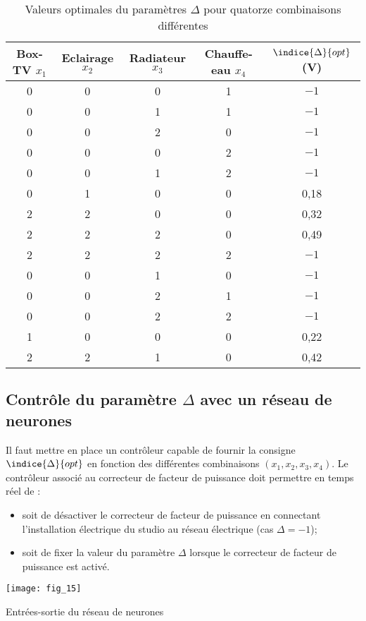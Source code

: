 \begin{table}[!h]
\centering
\begin{tabular}{ccccc}
\hline
Box-TV $x_1$ & Eclairage $x_2$ & Radiateur $x_3$ & Chauffe-eau $x_4$ & $\indice{\Delta}{opt}$ (V) \\
\hline
0 	& 0 	& 0 	& 1 	& $-1$ \\
0 	& 0	& 1 	& 1	& $-1$ \\
0 	& 0 	& 2 	& 0 	& $-1$ \\
0 	& 0 	& 0	& 2	& $-1$ \\
0 	& 0 	& 1	& 2	& $-1$ \\
0 	& 1 	& 0	& 0	& 0,18\\
2	& 2 	& 0	& 0	& 0,32\\
2	& 2 	& 2	& 0	& 0,49\\
2	& 2 	& 2	& 2	& $-1$ \\
\hline
\hline
0	& 0 	& 1	& 0	& $-1$ \\
0	& 0 	& 2	& 1	& $-1$ \\
0	& 0 	& 2	& 2	& $-1$ \\
1	& 0 	& 0	& 0 	& 0,22 \\
2	& 2 	& 1	& 0	& 0,42 \\
\hline
\end{tabular}
\caption{Valeurs optimales du paramètres $\Delta$ pour quatorze combinaisons différentes \label{Cy_07_ch_02_td_01_tab_03}}
\end{table}



\subsection*{Contrôle du paramètre $\Delta$ avec un réseau de neurones}
Il faut mettre en place un contrôleur capable de fournir la consigne $\indice{\Delta}{opt}$ en fonction des différentes combinaisons $\left(x_1, x_2, x_3, x_4 \right)$. Le contrôleur associé au correcteur de facteur de puissance doit permettre en temps réel de : 
\begin{itemize}
\item soit de désactiver le correcteur de facteur de puissance en connectant l'installation électrique du studio au réseau électrique (cas $\Delta = -1$);
\item soit de fixer la valeur du paramètre $\Delta$ lorsque le correcteur de facteur de puissance est activé.
\end{itemize}

\begin{marginfigure}
\centering
\texttt{[image: fig\_15]}
\caption{Entrées-sortie du réseau de neurones\label{Cy_07_ch_02_td_01_fig_15}}
\end{marginfigure}

